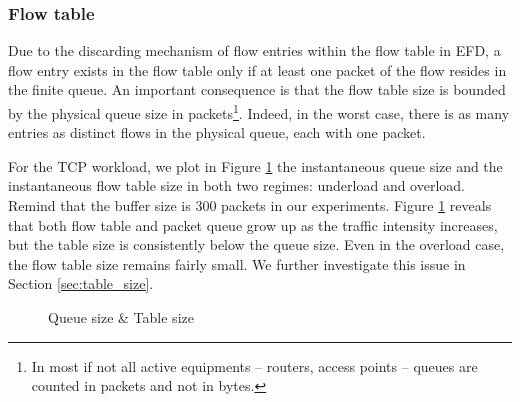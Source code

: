 \documentclass[preprint,12pt]{elsarticle}
\begin{document}
\subsubsection{Flow table}

Due to the discarding mechanism of flow entries within the flow table in EFD, a flow entry exists in the flow table only if at least one packet of the flow resides in the finite queue. An important consequence is that the flow table size is bounded by the physical queue size in packets\footnote{In most if not all active equipments -- routers, access points -- queues are counted in packets and not in bytes.}. Indeed, in the worst case, there is as many entries as distinct flows in the physical queue, each with one packet.

For the TCP workload, we plot in Figure \ref{fig:dynamics} the instantaneous queue size and the instantaneous flow table size in both two regimes: underload and overload. Remind that the buffer size is 300 packets in our experiments. Figure \ref{fig:dynamics} reveals that both flow table and packet queue grow up as the traffic intensity increases, but the table size is consistently below the queue size. Even in the overload case, the flow table size remains fairly small. We further investigate this issue in Section \ref{sec:table_size}.%

\begin{figure}[ht]
  \centering
  \caption{Queue size \& Table size}
  \label{fig:dynamics}
\end{figure}
\end{document}
